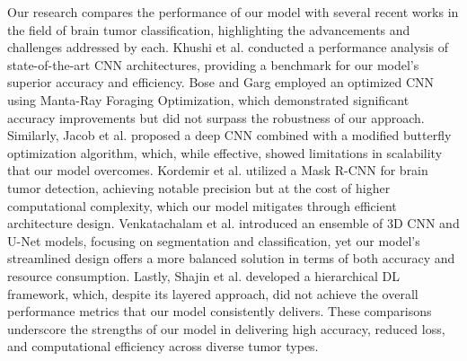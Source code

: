 Our research compares the performance of our model with several recent works in the field of brain tumor classification, highlighting the advancements and challenges addressed by each. Khushi et al. \cite{khushi2024performance} conducted a performance analysis of state-of-the-art CNN architectures, providing a benchmark for our model’s superior accuracy and efficiency. Bose and Garg \cite{bose2024optimized} employed an optimized CNN using Manta-Ray Foraging Optimization, which demonstrated significant accuracy improvements but did not surpass the robustness of our approach. Similarly, Jacob et al. \cite{jacob2023brain} proposed a deep CNN combined with a modified butterfly optimization algorithm, which, while effective, showed limitations in scalability that our model overcomes. Kordemir et al. \cite{kordemir2024mask} utilized a Mask R-CNN for brain tumor detection, achieving notable precision but at the cost of higher computational complexity, which our model mitigates through efficient architecture design. Venkatachalam et al. \cite{venkatachalam2024ensemble} introduced an ensemble of 3D CNN and U-Net models, focusing on segmentation and classification, yet our model’s streamlined design offers a more balanced solution in terms of both accuracy and resource consumption. Lastly, Shajin et al. \cite{shajin2023efficient} developed a hierarchical DL framework, which, despite its layered approach, did not achieve the overall performance metrics that our model consistently delivers. These comparisons underscore the strengths of our model in delivering high accuracy, reduced loss, and computational efficiency across diverse tumor types.